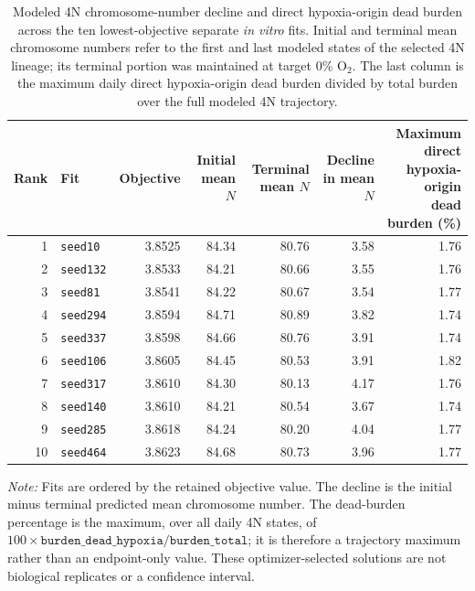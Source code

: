 \begin{table}[!htbp]
\centering
\small
\setlength{\tabcolsep}{4.5pt}
\caption{Modeled 4N chromosome-number decline and direct hypoxia-origin dead burden across the ten lowest-objective separate \textit{in vitro} fits. Initial and terminal mean chromosome numbers refer to the first and last modeled states of the selected 4N lineage; its terminal portion was maintained at target 0\% O$_2$. The last column is the maximum daily direct hypoxia-origin dead burden divided by total burden over the full modeled 4N trajectory.}
\label{tab:invitro_top10_4n_trajectory}
\begin{tabular}{@{}rlrrrrr@{}}
\toprule
Rank & Fit & Objective & Initial mean \(N\) & Terminal mean \(N\) & Decline in mean \(N\) & \shortstack{Maximum direct hypoxia-origin\\dead burden (\%)} \\
\midrule
1  & \texttt{seed10}  & 3.8525 & 84.34 & 80.76 & 3.58 & 1.76 \\
2  & \texttt{seed132} & 3.8533 & 84.21 & 80.66 & 3.55 & 1.76 \\
3  & \texttt{seed81}  & 3.8541 & 84.22 & 80.67 & 3.54 & 1.77 \\
4  & \texttt{seed294} & 3.8594 & 84.71 & 80.89 & 3.82 & 1.74 \\
5  & \texttt{seed337} & 3.8598 & 84.66 & 80.76 & 3.91 & 1.74 \\
6  & \texttt{seed106} & 3.8605 & 84.45 & 80.53 & 3.91 & 1.82 \\
7  & \texttt{seed317} & 3.8610 & 84.30 & 80.13 & 4.17 & 1.76 \\
8  & \texttt{seed140} & 3.8610 & 84.21 & 80.54 & 3.67 & 1.74 \\
9  & \texttt{seed285} & 3.8618 & 84.24 & 80.20 & 4.04 & 1.77 \\
10 & \texttt{seed464} & 3.8623 & 84.68 & 80.73 & 3.96 & 1.77 \\
\bottomrule
\end{tabular}
\par\vspace{0.5em}
\begin{minipage}{0.96\textwidth}
\footnotesize
\textit{Note:} Fits are ordered by the retained objective value. The decline is the initial minus terminal predicted mean chromosome number. The dead-burden percentage is the maximum, over all daily 4N states, of \(100\times\texttt{burden\_dead\_hypoxia}/\texttt{burden\_total}\); it is therefore a trajectory maximum rather than an endpoint-only value. These optimizer-selected solutions are not biological replicates or a confidence interval.
\end{minipage}
\end{table}
